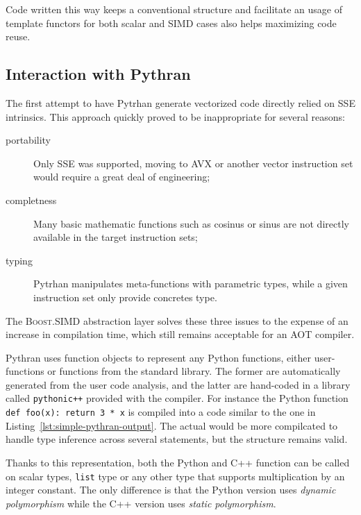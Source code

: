 \documentclass[preprint]{sigplanconf}
\providecommand{\boostsimd}{\textsc{Boost.SIMD}}
\begin{document}
Code written this way keeps a conventional structure and facilitate an usage of template
functors for both scalar and SIMD cases also helps maximizing code reuse.

\subsection{Interaction with Pythran}

The first attempt to have Pytrhan generate vectorized code directly relied on
SSE intrinsics. This approach quickly proved to be inappropriate for several
reasons:

\begin{description}

    \item[portability] Only SSE was supported, moving to AVX or another vector
        instruction set would require a great deal of engineering;

    \item[completness] Many basic mathematic functions such as cosinus or sinus
        are not directly available in the target instruction sets;

    \item[typing] Pytrhan manipulates meta-functions with parametric types,
        while a given instruction set only provide concretes type.

\end{description}

The \boostsimd{} abstraction layer solves these three issues to the expense of
an increase in compilation time, which still remains acceptable for an AOT
compiler.


Pythran uses function objects to represent any Python functions, either
user-functions or functions from the standard library. The former are
automatically generated from the user code analysis, and the latter are
hand-coded in a library called \texttt{pythonic++} provided with the compiler.
For instance the Python function \texttt{def foo(x): return 3 * x} is compiled
into a code similar to the one in Listing~\ref{lst:simple-pythran-output}. The
actual would be more compilcated to handle type inference across several
statements, but the structure remains valid.

Thanks to this representation, both the Python and C++ function can be called
on scalar types, \texttt{list} type or any other type that supports
multiplication by an integer constant. The only difference is that the Python
version uses \emph{dynamic polymorphism} while the C++ version uses
\emph{static polymorphism}.
\end{document}
